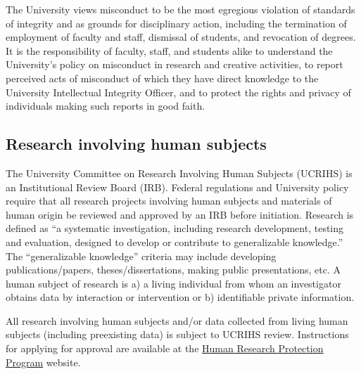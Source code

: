 The University views misconduct to be the most egregious violation of
standards of integrity and as grounds for disciplinary action,
including the termination of employment of faculty and staff,
dismissal of students, and revocation of degrees. It is the
responsibility of faculty, staff, and students alike to understand the
University's policy on misconduct in research and creative activities,
to report perceived acts of misconduct of which they have direct
knowledge to the University Intellectual Integrity Officer, and to
protect the rights and privacy of individuals making such reports in
good faith. 

\subsection{Research involving human subjects}

The University Committee on Research Involving Human Subjects (UCRIHS)
is an Institutional Review Board (IRB). Federal regulations and
University policy require that all research projects involving human
subjects and materials of human origin be reviewed and approved by an
IRB before initiation. Research is defined as ``a systematic
investigation, including research development, testing and evaluation,
designed to develop or contribute to generalizable knowledge.'' The
``generalizable knowledge'' criteria may include developing
publications/papers, theses/dissertations, making public
presentations, etc. A human subject of research is a) a living
individual from whom an investigator obtains data by interaction or
intervention or b) identifiable private information.  

All research involving human subjects and/or data collected from
living human subjects (including preexisting data) is subject to
UCRIHS review. Instructions for applying for approval are available at
the \href{http://hrpp.msu.edu/}{Human Research Protection Program}
website.

